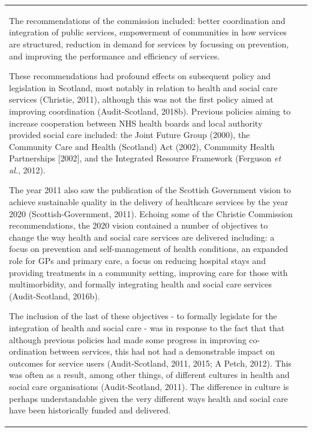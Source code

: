 \documentclass[12pt,a4paper,oneside,table]{report}
\begin{document}
\begin{tabular}[t]{ll}
The recommendations of the commission included: better coordination and
integration of public services, empowerment of communities in how
services are structured, reduction in demand for services by focussing
on prevention, and improving the performance and efficiency of services.

These recommendations had profound effects on subsequent policy and
legislation in Scotland, most notably in relation to health and social
care services (Christie, 2011), although this was not the first policy
aimed at improving coordination (Audit-Scotland, 2018b). Previous
policies aiming to increase cooperation between NHS health boards and
local authority provided social care included: the Joint Future Group
(2000), the Community Care and Health (Scotland) Act (2002), Community
Health Partnerships {[}2002{]}, and the Integrated Resource Framework
(Ferguson \emph{et al.}, 2012).

The year 2011 also saw the publication of the Scottish Government vision
to achieve sustainable quality in the delivery of healthcare services by
the year 2020 (Scottish-Government, 2011). Echoing some of the Christie
Commission recommendations, the 2020 vision contained a number of
objectives to change the way health and social care services are
delivered including: a focus on prevention and self-management of health
conditions, an expanded role for GPs and primary care, a focus on
reducing hospital stays and providing treatments in a community setting,
improving care for those with multimorbidity, and formally integrating
health and social care services (Audit-Scotland, 2016b).

The inclusion of the last of these objectives - to formally legislate
for the integration of health and social care - was in response to the
fact that that although previous policies had made some progress in
improving co-ordination between services, this had not had a
demonstrable impact on outcomes for service users (Audit-Scotland, 2011,
2015; A Petch, 2012). This was often as a result, among other things, of
different cultures in health and social care organisations
(Audit-Scotland, 2011). The difference in culture is perhaps
understandable given the very different ways health and social care have
been historically funded and delivered.


\end{tabular}
\end{document}
